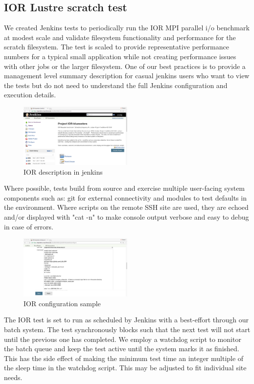 \documentclass[10pt, conference, compsocconf]{IEEEtran}
\begin{document}
\subsection{IOR Lustre scratch test}
We created Jenkins tests to periodically run the IOR MPI parallel i/o benchmark at modest scale and validate filesystem functionality and performance for the scratch filesystem. The test is scaled to provide representative performance numbers for a typical small application while not creating performance issues with other jobs or the larger filesystem.  One of our best practices is to provide a management level summary description for casual jenkins users who want to view the tests but do not need to understand the full Jenkins configuration and execution details.  
\begin{figure}[H]
\centering
\includegraphics[width=0.5\textwidth]{IOR-bluewaters-descr}
\caption{ IOR description in jenkins }
\label{fig:IOR-bluewaters-descr}
\end{figure}
Where possible, tests build from source and exercise multiple user-facing system components such as: git for external connectivity and modules to test defaults in the environment.  Where scripts on the remote SSH site are used, they are echoed and/or displayed with "cat -n" to make console output verbose and easy to debug in case of errors.  
\begin{figure}[H]
\centering
\includegraphics[width=0.5\textwidth]{IOR-configuration-sample}
\caption{ IOR configuration sample }
\label{fig:IOR-configuration-sample}
\end{figure}
The IOR test is set to run as scheduled by Jenkins with a best-effort through our batch system.  The test synchronously blocks such that the next test will not start until the previous one has completed.  We employ a watchdog script to monitor the batch queue and keep the test active until the system marks it as finished.  This has the side effect of making the minimum test time an integer multiple of the sleep time in the watchdog script.  This may be adjusted to fit individual site needs.
\end{document}
